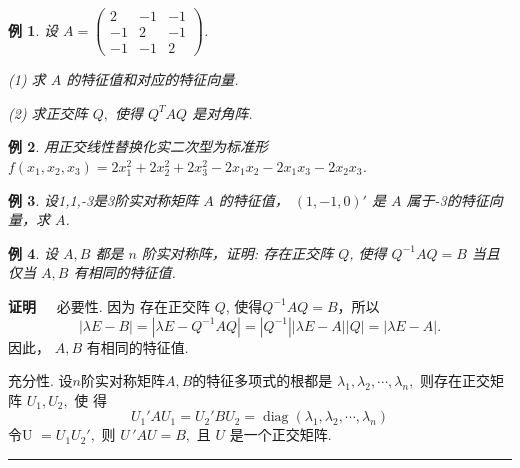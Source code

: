 \documentclass[13pt]{beamer}
\newtheorem{exa}{例}
\def\qed{\nopagebreak\hfill{\rule{4pt}{7pt}}\medbreak}
\def\pf{{\bf 证明~~ }}
\begin{document}
	\setcounter{exa}{0}

\begin{frame}
\begin{exa}
设 $A=\left(\begin{array}{ccc}2 & -1 & -1 \\ -1 & 2 & -1 \\ -1 & -1 & 2\end{array}\right)$.

(1) 求 $A$ 的特征值和对应的特征向量.

(2) 求正交阵 $Q,$ 使得 $Q^{T} A Q$ 是对角阵.
\end{exa}

\begin{exa}
 用正交线性替换化实二次型为标准形 $f\left(x_{1}, x_{2}, x_{3}\right)=2 x_{1}^{2}+2 x_{2}^{2}+2 x_{3}^{2}-2 x_{1} x_{2}-2 x_{1} x_{3}-2 x_{2} x_{3}$.
\end{exa}

\begin{exa}
	设1,1,-3是3阶实对称矩阵 $A$ 的特征值，  $(1,-1,0){'}$ 是 $A$ 属于-3的特征向量，求 $A$.
\end{exa}
\end{frame}


\begin{frame}



\begin{exa}
设 $A, B$ 都是 $n$ 阶实对称阵，证明: 存在正交阵 $Q$, 使得 $Q^{-1} A Q=B$ 当且仅当 $A, B$ 有相同的特征值.
\end{exa}

\pf 必要性. 因为 存在正交阵 $Q$, 使得$Q^{-1} A Q=B$，所以$$|\lambda E-B| = |\lambda E-Q^{-1} A Q|= |Q^{-1}| |\lambda E- A | |Q|  = |\lambda E- A |.$$
因此， $A, B$ 有相同的特征值.

充分性.
 设$n$阶实对称矩阵$A, B$的特征多项式的根都是 $\lambda_{1}, \lambda_{2}, \cdots, \lambda_{n},$ 则存在正交矩阵 $U_{1}, U_{2},$ 使
得
\[
U_{1}{'} A U_{1}=U_{2}{'} B U_{2}=\operatorname{diag}\left(\lambda_{1}, \lambda_{2}, \cdots, \lambda_{n}\right)
\]
令U $=U_{1} U_{2}{'},$ 则 $U{\,'} A U=B,$ 且 $U$ 是一个正交矩阵.
\qed
\end{frame}
\end{document}
